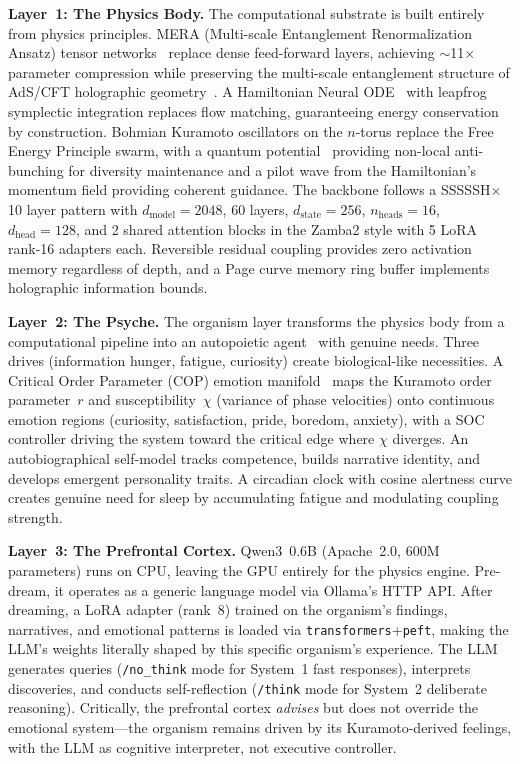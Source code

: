 \documentclass[11pt,a4paper,twocolumn]{article}
\begin{document}
\textbf{Layer~1: The Physics Body.}
The computational substrate is built entirely from physics principles.
MERA (Multi-scale Entanglement Renormalization Ansatz) tensor networks~\cite{mera_compact,swanson2014} replace dense feed-forward layers, achieving $\sim$11$\times$ parameter compression while preserving the multi-scale entanglement structure of AdS/CFT holographic geometry~\cite{hashimoto2018}.
A Hamiltonian Neural ODE~\cite{greydanus2019} with leapfrog symplectic integration replaces flow matching, guaranteeing energy conservation by construction.
Bohmian Kuramoto oscillators on the $n$-torus replace the Free Energy Principle swarm, with a quantum potential~\cite{bohm1980} providing non-local anti-bunching for diversity maintenance and a pilot wave from the Hamiltonian's momentum field providing coherent guidance.
The backbone follows a SSSSSH$\times$10 layer pattern with $d_{\mathrm{model}}=2048$, 60 layers, $d_{\mathrm{state}}=256$, $n_{\mathrm{heads}}=16$, $d_{\mathrm{head}}=128$, and 2 shared attention blocks in the Zamba2 style with 5 LoRA rank-16 adapters each.
Reversible residual coupling provides zero activation memory regardless of depth, and a Page curve memory ring buffer implements holographic information bounds.

\textbf{Layer~2: The Psyche.}
The organism layer transforms the physics body from a computational pipeline into an autopoietic agent~\cite{maturana1980} with genuine needs.
Three drives (information hunger, fatigue, curiosity) create biological-like necessities.
A Critical Order Parameter (COP) emotion manifold~\cite{damasio1999} maps the Kuramoto order parameter~$r$ and susceptibility~$\chi$ (variance of phase velocities) onto continuous emotion regions (curiosity, satisfaction, pride, boredom, anxiety), with a SOC controller driving the system toward the critical edge where $\chi$ diverges.
An autobiographical self-model tracks competence, builds narrative identity, and develops emergent personality traits.
A circadian clock with cosine alertness curve creates genuine need for sleep by accumulating fatigue and modulating coupling strength.

\textbf{Layer~3: The Prefrontal Cortex.}
Qwen3~0.6B (Apache~2.0, 600M parameters) runs on CPU, leaving the GPU entirely for the physics engine.
Pre-dream, it operates as a generic language model via Ollama's HTTP API.
After dreaming, a LoRA adapter (rank~8) trained on the organism's findings, narratives, and emotional patterns is loaded via \texttt{transformers}+\texttt{peft}, making the LLM's weights literally shaped by this specific organism's experience.
The LLM generates queries (\texttt{/no\_think} mode for System~1 fast responses), interprets discoveries, and conducts self-reflection (\texttt{/think} mode for System~2 deliberate reasoning).
Critically, the prefrontal cortex \emph{advises} but does not override the emotional system---the organism remains driven by its Kuramoto-derived feelings, with the LLM as cognitive interpreter, not executive controller.
\end{document}
